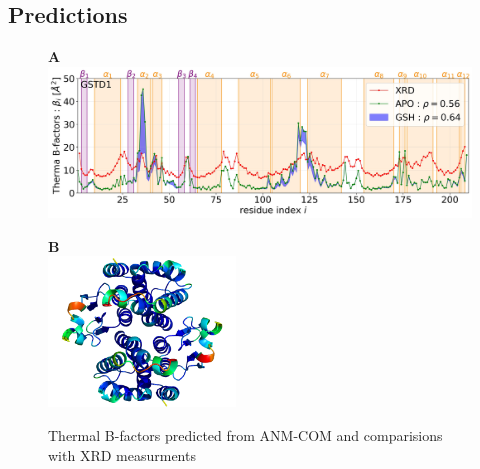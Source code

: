 \subsection{Predictions}
\begin{figure}[h!]
	\label{ANM-COM D1}
	\begin{minipage}{.68\linewidth}
		\textbf{A}\\
		\includegraphics[height = 4cm]{figures/GSTD1+GSH_ANM-COM_Bfactors.jpg}
	\end{minipage}
	\begin{minipage}{.30\linewidth}
		\textbf{B}\\
		\includegraphics[height = 4cm]{figures/GSTD1_ANM-COM_Bfactors_structure.png}
	\end{minipage}
	\caption{Thermal B-factors predicted from ANM-COM and comparisions with XRD measurments}
\end{figure}

